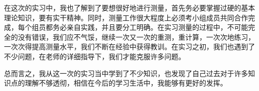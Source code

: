 \documentclass[UTF8]{ctexart}
\begin{document}
	在这次的实习中，我也了解到了要想很好地进行测量，首先务必要掌握过硬的基本理论知识，要有实干精神。同时，测量工作很大程度上必须考小组成员共同合作完成，每个组员都务必亲自实践，并且要分工明确。在实习测量的过程中，不可能完全的没有错误，我们应不气馁，继续一次又一次的重测，重计算，一次次地练习，一次次得提高测量水平，我们不断在经验中获得教训。在实习之初，我们也遇到了不少问题，在老师的详细指导下，我们才能克服许多问题。
	
	总而言之，我从这一次的实习当中学到了不少知识，也发现了自己过去对于许多知识点的理解不够透彻，相信在今后的学习生活中，我能够有更好的发挥。
\end{document}
